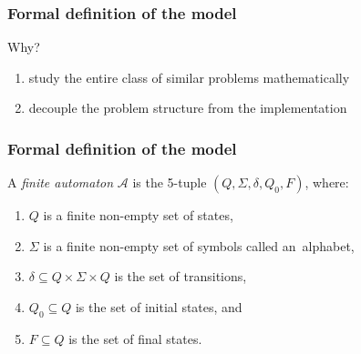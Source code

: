 \documentclass{beamer}
\begin{document}
    \begin{frame}
        \frametitle{Formal definition of the model}
        Why?
        \begin{enumerate}
            \item study the entire class of similar problems mathematically
            \item decouple the problem structure from the implementation
        \end{enumerate}
    \end{frame}

    \begin{frame}
        \frametitle{Formal definition of the model}
        A \textit{finite automaton} $\mathcal{A}$ is the 5-tuple $(Q, \Sigma, \delta, Q_0, F)$, where:
        \begin{enumerate}
            \item $Q$ is a finite non-empty set of states,
            \item $\Sigma$ is a finite non-empty set of symbols called an~alphabet,
            \item $\delta \subseteq Q \times \Sigma \times Q$ is the set of transitions,
            \item $Q_0 \subseteq Q$ is the set of initial states, and 
            \item $F \subseteq Q$ is the set of final states.
        \end{enumerate}
    \end{frame}
\end{document}
